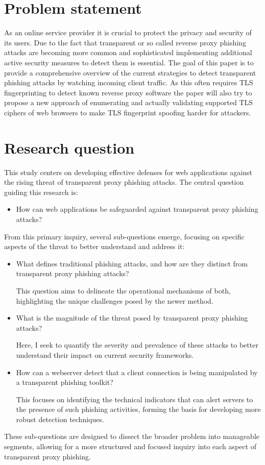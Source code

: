 \documentclass[12pt]{scrbook}
\begin{document}
\newpage \section{Problem statement} As an online service provider
it is crucial to protect the privacy and security of its users. Due to the
fact that transparent or so called reverse proxy phishing attacks are
becoming more common and sophisticated implementing additional active
security measures to detect them is essential. The goal of this paper is to
provide a comprehensive overview of the current strategies to detect
transparent phishing attacks by watching incoming client traffic. As this
often requires TLS fingerprinting to detect known reverse proxy software the
paper will also try to propose a new approach of enumerating and actually
validating supported TLS ciphers of web browsers to make TLS fingerprint
spoofing harder for attackers.

\section{Research question}
This study centers on developing effective defenses for web applications against the rising threat of transparent proxy phishing attacks. The central question guiding this research is:
\begin{itemize}
    \item How can web applications be safeguarded against transparent proxy phishing attacks?
\end{itemize}
From this primary inquiry, several sub-questions emerge, focusing on specific aspects of the threat to better understand and address it:
\begin{itemize}
    \item What defines traditional phishing attacks, and how are they distinct from transparent proxy phishing attacks?

    This question aims to delineate the operational mechanisms of both, highlighting the unique challenges posed by the newer method.
    \item What is the magnitude of the threat posed by transparent proxy phishing attacks?

    Here, I seek to quantify the severity and prevalence of these attacks to better understand their impact on current security frameworks.
    \item How can a webserver detect that a client connection is being manipulated by a transparent phishing toolkit?

    This focuses on identifying the technical indicators that can alert servers to the presence of such phishing activities, forming the basis for developing more robust detection techniques.
\end{itemize}
These sub-questions are designed to dissect the broader problem into manageable segments, allowing for a more structured and focused inquiry into each aspect of transparent proxy phishing.
\end{document}
